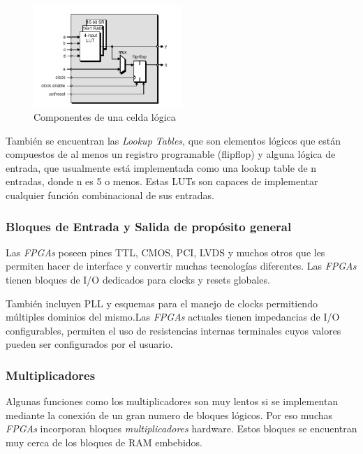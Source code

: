 \begin{figure}[h!]
 \begin{center}
 \includegraphics[width=0.5\textwidth,keepaspectratio=true]{./images/celda}
  \caption{Componentes de una celda lógica}
  \label{fig:esquema}
 \end{center}
\end{figure}

También se encuentran las \textit{Lookup Tables}, que son elementos lógicos que están compuestos de al menos un registro programable (flip\-flop) y alguna lógica de entrada, que usualmente está implementada como una lookup table de n entradas, donde n es 5 o menos. Estas LUTs son capaces de implementar cualquier función combinacional de sus entradas.

	\subsubsection{Bloques de Entrada y Salida de propósito general}

Las \textit{FPGAs} poseen pines TTL, CMOS, PCI, LVDS y muchos otros que les permiten hacer de interface y convertir muchas tecnologías diferentes. Las \textit{FPGAs} tienen bloques de I/O dedicados para clocks y resets globales.  

También incluyen PLL y esquemas para el manejo de clocks permitiendo múltiples dominios del mismo.Las \textit{FPGAs} actuales tienen impedancias de I/O configurables,  permiten el uso de resistencias internas terminales cuyos valores pueden ser configurados por el usuario.

\subsubsection{Multiplicadores}

Algunas funciones como los multiplicadores son muy lentos si se implementan mediante la conexión de un gran numero de bloques lógicos. Por eso muchas \textit{FPGAs} incorporan bloques \textit{multiplicadores} hardware. Estos bloques se encuentran muy cerca de los bloques de RAM embebidos. 

